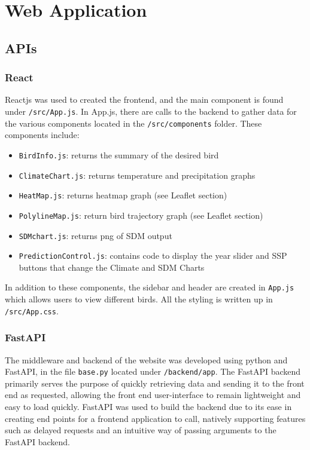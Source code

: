\documentclass{article}
\begin{document}
\section{Web Application}

\subsection{APIs}

\subsubsection{React}
Reactjs was used to created the frontend, and the main component is found under \texttt{/src/App.js}. In App.js, there are calls to the backend to gather data for the various components
located in the \texttt{/src/components} folder. These components include:
\begin{itemize}
	\item \texttt{BirdInfo.js}: returns the summary of the desired bird
	\item \texttt{ClimateChart.js}: returns temperature and precipitation graphs
	\item \texttt{HeatMap.js}: returns heatmap graph (see Leaflet section)
	\item \texttt{PolylineMap.js}: return bird trajectory graph (see Leaflet section)
	\item \texttt{SDMchart.js}: returns png of SDM output
	\item \texttt{PredictionControl.js}: contains code to display the year slider and SSP buttons that change the Climate and SDM Charts
\end{itemize}

\noindent In addition to these components, the sidebar and header are created in \texttt{App.js} which allows users to view different birds. All the styling is written up in \texttt{/src/App.css}. 


\subsubsection{FastAPI}
The middleware and backend of the website was developed using python and FastAPI, in the file \texttt{base.py} located under \texttt{/backend/app}. The FastAPI backend primarily serves the purpose of quickly retrieving data and sending it to the front end as requested, allowing the front end user-interface to remain lightweight and easy to load quickly. FastAPI was used to build the backend due to its ease in creating end points for a frontend application to call, natively supporting features such as delayed requests and an intuitive way of passing arguments to the FastAPI backend.
\end{document}
